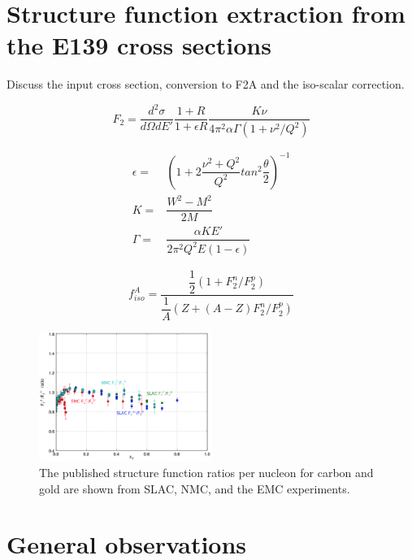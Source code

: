 \documentclass[oneside]{article}
\begin{document}
\section{Structure function extraction from the E139 cross sections}

Discuss the input cross section, conversion to F2A and the iso-scalar correction.



\begin{equation}
F_2 = \dfrac{d^2\sigma}{d\Omega dE'}\dfrac{1+R}{1+\epsilon R}\dfrac{K\nu}{4\pi^2\alpha\Gamma (1+\nu^2/Q^2)}
\label{eq:matrixelements}
\end{equation}

\begin{align}
\epsilon=&(1+2\dfrac{\nu^2+Q^2}{Q^2}tan^2\dfrac{\theta}{2})^{-1}\\
K=&\dfrac{W^2-M^2}{2M}\\
\Gamma=&\dfrac{\alpha KE'}{2\pi^2Q^2E(1-\epsilon)}
\label{eq:matrixeqn}
\end{align}

\begin{equation}
f_{iso}^A = \dfrac{\dfrac{1}{2}(1+F_2^n/F_2^p)}{\dfrac{1}{A}(Z+(A-Z)F_2^n/F_2^p)}
\label{eq:matrixelements}
\end{equation}

\begin{figure}[H]
  \centering
      	  \includegraphics[width=0.5\textwidth]{plots/emc_ratios_data.png}
 	 \caption[EMC ratios for various data]{The published structure function ratios per nucleon for carbon and gold are shown from SLAC, NMC, and the EMC experiments.}
  \label{fig:emc_ratios}
 \end{figure}

\section{General observations}
 
\end{document}
